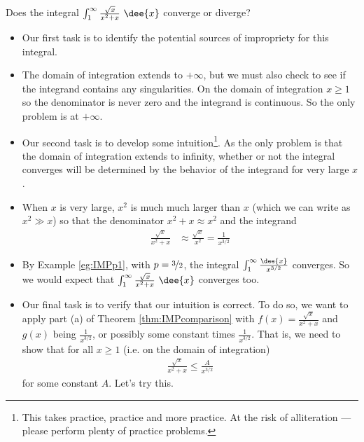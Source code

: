 \begin{eg}\label{eg:IMPp10}
Does the integral
$\int_1^\infty\frac{\sqrt{x}}{x^2+x}\ \dee{x}$
converge or diverge?

\soln
\begin{itemize}
 \item Our first task is to identify the potential sources of impropriety
for this integral.

\item The domain of integration extends to $+\infty$, but we must also check to
see if the integrand contains any singularities. On the domain of integration
$x\ge 1$ so the denominator is never zero and the integrand is continuous. So
the only problem is at $+\infty$.

\item Our second task is to develop some intuition\footnote{This takes
practice, practice and more practice. At the risk of alliteration --- please
perform plenty of practice problems.}. As the only problem is that
the domain of integration extends to infinity, whether or not the integral
converges will be determined by the behavior of the integrand for very
large $x$.

\item When $x$ is very large, $x^2$ is much much larger than $x$ (which we can
write as $x^2\gg x$) so that the denominator
$x^2+x\approx x^2$ and the integrand
\begin{align*}
\frac{\sqrt{x}}{x^2+x} & \approx \frac{\sqrt{x}}{x^2} =\frac{1}{x^{3/2}}
\end{align*}

\item By Example \ref{eg:IMPp1}, with $p=\nicefrac{3}{2}$, the integral
$\int_1^\infty \frac{\dee{x}}{x^{3/2}}$ converges. So we would expect that
$\int_1^\infty\frac{\sqrt{x}}{x^2+x}\ \dee{x}$ converges too.

\item Our final task is to verify that our intuition is correct.
To do so, we want to apply part (a) of Theorem \ref{thm:IMPcomparison}
with $f(x)= \frac{\sqrt{x}}{x^2+x}$ and $g(x)$ being $\frac{1}{x^{3/2}}$,
or possibly some constant times $\frac{1}{x^{3/2}}$. That is, we need to show
that for all $x \geq 1$ (i.e. on the domain of integration)
\begin{align*}
  \frac{\sqrt{x}}{x^2+x} \leq \frac{A}{x^{3/2}}
\end{align*}
for some constant $A$. Let's try this.


\end{itemize}
\end{eg}
